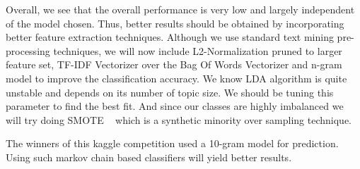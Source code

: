 \documentclass{article} %
\begin{document}
Overall, we see that the overall performance is very low and largely independent of the model chosen. Thus, better results should be obtained by incorporating better feature extraction techniques. Although we use standard text mining pre-processing techniques, we will now include L2-Normalization pruned to larger feature set, TF-IDF Vectorizer over the Bag Of Words Vectorizer and n-gram model to improve the classification accuracy. We know LDA algorithm is quite unstable and depends on its number of topic size. We should be tuning this parameter to find the best fit. And since our classes are highly imbalanced we will try doing SMOTE ~\cite{chawla2002smote} which is a synthetic minority over sampling technique.

The winners of this kaggle competition used a 10-gram model for prediction. Using such markov chain based classifiers will yield better results.



\medskip

\end{document}

